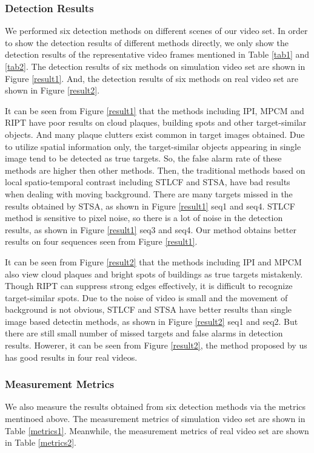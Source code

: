 \documentclass[journal]{IEEEtran}
\begin{document}
\subsubsection{Detection Results}
We performed six detection methods on different scenes of our video set. In order to show the detection results of different methods directly, we only show the detection results of the representative video frames mentioned in Table \ref{tab1} and \ref{tab2}. The detection results of six methods on simulation video set are shown in Figure \ref{result1}. And, the detection results of six methods on real video set are shown in Figure \ref{result2}.

It can be seen from Figure \ref{result1} that the methods including IPI, MPCM and RIPT have poor results on cloud plaques, building spots and other target-similar objects. And many plaque clutters exist common in target images obtained. Due to utilize spatial information only, the target-similar objects appearing in single image tend to be detected as true targets. So, the false alarm rate of these methods are higher then other methods. Then, the traditional methods based on local spatio-temporal contrast including STLCF and STSA, have bad results when dealing with moving background. There are many targets missed in the results obtained by STSA, as shown in Figure \ref{result1} seq1 and seq4. STLCF method is sensitive to pixel noise, so there is a lot of noise in the detection results, as shown in Figure \ref{result1} seq3 and seq4. Our method obtains better results on four sequences seen from Figure \ref{result1}.

It can be seen from Figure \ref{result2} that the methods including IPI and MPCM also view cloud plaques and bright spots of buildings as true targets mistakenly. Though RIPT can suppress strong edges effectively, it is difficult to recognize target-similar spots. Due to the noise of video is small and the movement of background is not obvious, STLCF and STSA have better results than single image based detectin methods, as shown in Figure \ref{result2} seq1 and seq2. But there are still small number of missed targets and false alarms in detection results. Howerer, it can be seen from Figure \ref{result2}, the method proposed by us has good results in four real videos.





\subsubsection{Measurement Metrics}
We also measure the results obtained from six detection methods via the metrics mentinoed above. The measurement metrics of simulation video set are shown in Table \ref{metrics1}. Meanwhile, the measurement metrics of real video set are shown in Table \ref{metrics2}.
\end{document}

